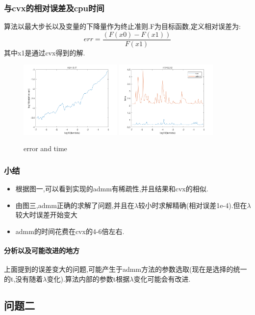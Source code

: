 \documentclass[UTF8]{ctexart}
\begin{document}
\subsubsection{与cvx的相对误差及cpu时间}
算法以最大步长以及变量的下降量作为终止准则.F为目标函数,定义相对误差为:
$$
err=\frac{(F(x0)-F(x1))}{F(x1)}
$$
其中x1是通过cvx得到的解.
\begin{figure}[H]
  \centering
  \includegraphics[width=0.45\textwidth]{err.png}
  \includegraphics[width=0.45\textwidth]{time.png}
  \caption{error and time}\label{err}
\end{figure}
  \subsubsection{小结}
  \begin{itemize}
    \item 根据图一,可以看到实现的admm有稀疏性,并且结果和cvx的相似.
    \item 由图三,admm正确的求解了问题,并且在$\lambda$较小时求解精确(相对误差1e-4).但在$\lambda$较大时误差开始变大
    \item admm的时间花费在cvx的4-6倍左右.
  \end{itemize}
  \paragraph{分析以及可能改进的地方}
  上面提到的误差变大的问题,可能产生于admm方法的参数选取(现在是选择的统一的t,没有随着$\lambda$变化).算法内部的参数t根据$\lambda$变化可能会有改进.
  
  
  \subsection{问题二}
  
\end{document}
